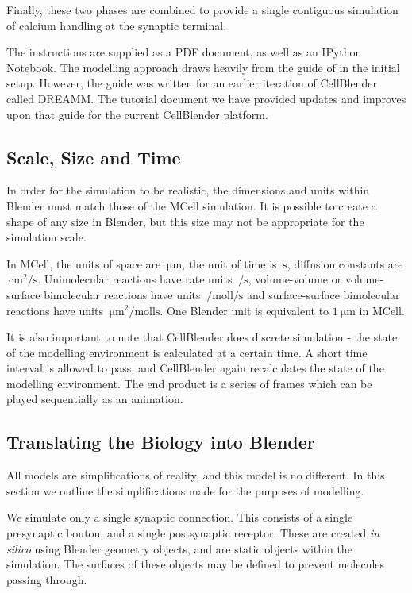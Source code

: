 \documentclass[a4paper]{article}
\begin{document}
Finally, these two phases are combined to provide a single contiguous simulation of calcium handling at the synaptic terminal.

The instructions are supplied as a PDF document, as well as an IPython Notebook. The modelling approach draws heavily from the guide of \cite{Czech:MethodsMolBiol:2009} in the initial setup. However, the guide was written for an earlier iteration of CellBlender called DREAMM. The tutorial document we have provided updates and improves upon that guide for the current CellBlender platform.

\subsection{Scale, Size and Time}
In order for the simulation to be realistic, the dimensions and units within Blender must match those of the MCell simulation. It is possible to create a shape of any size in Blender, but this size may not be appropriate for the simulation scale.

In MCell, the units of space are $\SI{}{\micro\metre}$, the unit of time is $\SI{}{\second}$, diffusion constants are $\SI{}{\centi\metre\squared\per\second}$. Unimolecular reactions have rate units $\SI{}{\per\second}$, volume-volume or volume-surface bimolecular reactions have units $\SI{}{\per\mole\litre\per\second}$ and surface-surface bimolecular reactions have units $\SI{}{\micro\metre\squared\per\mole\litre\second}$. One Blender unit is equivalent to $\SI{1}{\micro\metre}$ in MCell. 

It is also important to note that CellBlender does discrete simulation - the state of the modelling environment is calculated at a certain time. A short time interval is allowed to pass, and CellBlender again recalculates the state of the modelling environment. The end product is a series of frames which can be played sequentially as an animation.

\subsection{Translating the Biology into Blender}
All models are simplifications of reality, and this model is no different. In this section we outline the simplifications made for the purposes of modelling.

We simulate only a single synaptic connection. This consists of a single presynaptic bouton, and a single postsynaptic receptor. These are created \textit{in silico} using Blender geometry objects, and are static objects within the simulation. The surfaces of these objects may be defined to prevent molecules passing through.
\end{document}
